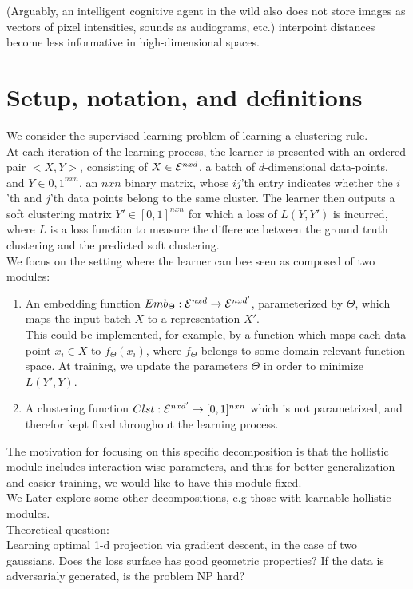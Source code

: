 (Arguably, an intelligent cognitive agent in the wild also does not store images as vectors of pixel intensities, sounds as audiograms, etc.) 
interpoint distances become less informative in high-dimensional spaces.


\section{Setup, notation, and definitions}
We consider the supervised learning problem of learning a clustering rule.\\ %
At each iteration of the learning process, the learner is presented with an ordered pair $<X,Y>$, consisting of $X\in\mathcal{E}^{nxd}$, a batch of $d$-dimensional data-points, and $Y\in {0,1}^{nxn}$, an $nxn$ binary matrix, whose $ij$'th entry indicates whether the $i$'th and $j$'th data points belong to the same cluster. The learner then outputs a soft clustering matrix $Y'\in [0,1]^{nxn}$ for which a loss of $L(Y,Y')$ is incurred, where $L$ is a loss function to measure the difference between the ground truth clustering and the predicted soft clustering.\\
We focus on the setting where the learner can bee seen as composed of two modules: \\
\begin{enumerate}
\item An embedding function $Emb_{\Theta}:\mathcal{E}^{nxd}\rightarrow\mathcal{E}^{nxd'}$, parameterized by $\Theta$, which maps the input batch $X$ to a representation $X'$.\\This could be implemented, for example, by a function which maps each data point $x_i\in X$ to $f_\Theta(x_i)$, where $f_\Theta$ belongs to some domain-relevant function space. At training, we update the parameters $\Theta$ in order to minimize $L(Y',Y)$. 
\item A clustering function $Clst:\mathcal{E}^{nxd'}\rightarrow [0,1]^{nxn}$ which is not parametrized, and therefor kept fixed throughout the learning process.
\end{enumerate}
The motivation for focusing on this specific decomposition is that the hollistic module includes interaction-wise parameters, and thus for better generalization and easier training, we would like to have this module fixed.\\ We Later explore some other decompositions, e.g those with learnable hollistic modules. \\
Theoretical question:\\
Learning optimal 1-d projection via gradient descent, in the case of two gaussians. Does the loss surface has good geometric properties?
 If the data is adversarialy generated, is the problem NP hard?

